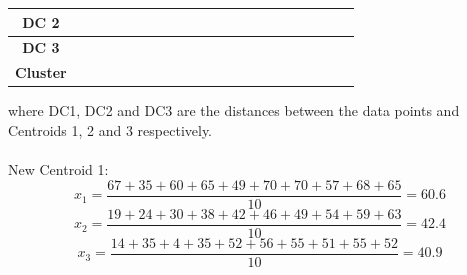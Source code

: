 \documentclass{book}
\begin{document}
\begin{center}
{\begin{tabular}{|c|c|c|c|c|c|c|c|c|c|c|c|c|c|c|c|c|c|c|c|c|}
            \hline
            \textbf{DC 2} & \cellcolor{lightyellow}{55} & \cellcolor{lightred}{75} & \cellcolor{lightred}{49} & \cellcolor{lightred}{72} & \cellcolor{lightred}{52} & \cellcolor{lightred}{34} & \cellcolor{lightred}{48} & \cellcolor{lightred}{47} & \cellcolor{lightred}{33} & \cellcolor{lightred}{42} & \cellcolor{lightyellow}{16} & \cellcolor{lightred}{38} & \cellcolor{lightyellow}{0} & \cellcolor{lightgreen}{51} & \cellcolor{lightgreen}{60} & \cellcolor{lightgreen}{44} & \cellcolor{lightgreen}{38} & \cellcolor{lightgreen}{49} & \cellcolor{lightgreen}{40} & \cellcolor{lightgreen}{49} \\
            \hline
            \textbf{DC 3} & \cellcolor{lightyellow}{84} & \cellcolor{lightred}{86} & \cellcolor{lightred}{73} & \cellcolor{lightred}{76} & \cellcolor{lightred}{65} & \cellcolor{lightred}{60} & \cellcolor{lightred}{65} & \cellcolor{lightred}{63} & \cellcolor{lightred}{51} & \cellcolor{lightred}{54} & \cellcolor{lightyellow}{39} & \cellcolor{lightred}{48} & \cellcolor{lightyellow}{40} & \cellcolor{lightgreen}{36} & \cellcolor{lightgreen}{40} & \cellcolor{lightgreen}{25} & \cellcolor{lightgreen}{26} & \cellcolor{lightgreen}{22} & \cellcolor{lightgreen}{0} & \cellcolor{lightgreen}{11} \\
            \hline
            \textbf{Cluster} & \cellcolor{lightyellow}{2} & \cellcolor{lightred}{1} & \cellcolor{lightred}{1} & \cellcolor{lightred}{1} & \cellcolor{lightred}{1} & \cellcolor{lightred}{1} & \cellcolor{lightred}{1} & \cellcolor{lightred}{1} & \cellcolor{lightred}{1} & \cellcolor{lightred}{1} & \cellcolor{lightyellow}{2} & \cellcolor{lightred}{1} & \cellcolor{lightyellow}{2} & \cellcolor{lightgreen}{3} & \cellcolor{lightgreen}{3} & \cellcolor{lightgreen}{3} & \cellcolor{lightgreen}{3} & \cellcolor{lightgreen}{3} & \cellcolor{lightgreen}{3} & \cellcolor{lightgreen}{3} \\      
            \hline
        \end{tabular}
    }
\end{center}
where DC1, DC2 and DC3 are the distances between the data points and Centroids 1, 2 and 3 respectively.\\
\vspace{2mm}
\\
New Centroid 1: 
\[
    x_1 = \frac{67 + 35 + 60 + 65 + 49 + 70 + 70 + 57 + 68 + 65}{10} = 60.6
\]
\[
    x_2 = \frac{19 + 24 + 30 + 38 + 42 + 46 + 49 + 54 + 59 + 63}{10} = 42.4
\]
\[
    x_3 = \frac{14 + 35 + 4 + 35 + 52 + 56 + 55 + 51 + 55 + 52}{10} = 40.9
\]
\end{document}
